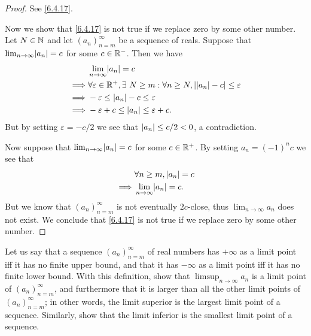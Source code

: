 \begin{proof}
  See \cref{6.4.17}.

  Now we show that \cref{6.4.17} is not true if we replace zero by some other number.
  Let \(N \in \mathbb{N}\) and let \((a_n)_{n = m}^\infty\) be a sequence of reals.
  Suppose that \(\lim_{n \to \infty} \abs{a_n} = c\) for some \(c \in \mathbb{R}^-\).
  Then we have
  \begin{align*}
             & \lim_{n \to \infty} \abs{a_n} = c                                                                        \\
    \implies & \forall \varepsilon \in \R^+, \exists\ N \geq m : \forall n \geq N, \abs{\abs{a_n} - c} \leq \varepsilon \\
    \implies & -\varepsilon \leq \abs{a_n} - c \leq \varepsilon                                                         \\
    \implies & -\varepsilon + c \leq \abs{a_n} \leq \varepsilon + c.
  \end{align*}
  But by setting \(\varepsilon = -c / 2\) we see that \(\left\lvert a_n\right\rvert \leq c / 2 < 0\), a contradiction.

  Now suppose that \(\lim_{n \to \infty} \abs{a_n} = c\) for some \(c \in \mathbb{R}^+\).
  By setting \(a_n = (-1)^n c\) we see that
  \begin{align*}
             & \forall n \geq m, \abs{a_n} = c    \\
    \implies & \lim_{n \to \infty} \abs{a_n} = c.
  \end{align*}
  But we know that \((a_n)_{n = m}^\infty\) is not eventually \(2c\)-close, thus \(\lim_{n \to \infty} a_n\) does not exist.
  We conclude that \cref{6.4.17} is not true if we replace zero by some other number.
\end{proof}

\begin{ex}\label{ex:6.4.8}
  Let us say that a sequence \((a_n)_{n = m}^\infty\) of real numbers has \(+\infty\) as a limit point iff it has no finite upper bound, and that it has \(-\infty\) as a limit point iff it has no finite lower bound.
  With this definition, show that \(\limsup_{n \to \infty} a_n\) is a limit point of \((a_n)_{n = m}^\infty\), and furthermore that it is larger than all the other limit points of \((a_n)_{n = m}^\infty\);
  in other words, the limit superior is the largest limit point of a sequence.
  Similarly, show that the limit inferior is the smallest limit point of a sequence.
\end{ex}

